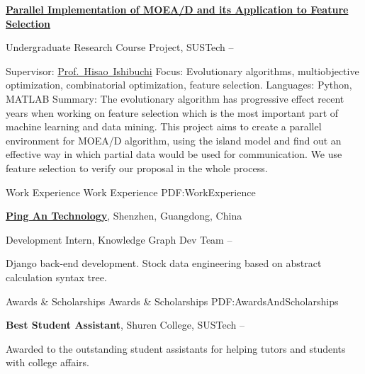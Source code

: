 \documentclass[a4paper,MMMyyyy,nonstopmode]{simpleresumecv}
\begin{document}
\begin{Body}
    \Entry
    \href{https://github.com/hackroid/pMOEA-D}
    {\textbf{Parallel Implementation of MOEA/D and its Application to Feature Selection}}

    \Gap
    \BulletItem
    Undergraduate Research Course Project, SUSTech
    \hfill
     --
    \begin{Detail}
        \SubBulletItem
        Supervisor:
        \href{http://cse.sustech.edu.cn/faculty/~hisao/}{Prof.~Hisao~Ishibuchi}
        \SubBulletItem
        Focus:
        Evolutionary algorithms, multiobjective optimization, combinatorial optimization, feature selection.
        \SubBulletItem
        Languages: Python, MATLAB
        \SubBulletItem
        Summary:
        The evolutionary algorithm has progressive effect recent years when working on feature selection which is the most important part of machine learning and data mining. This project aims to create a parallel environment for MOEA/D algorithm, using the island model and find out an effective way in which partial data would be used for communication. We use feature selection to verify our proposal in the whole process.
    \end{Detail}



    \Section
    {Work\newline
        Experience}
    {Work Experience}
    {PDF:WorkExperience}

    \Entry
    \href{https://tech.pingan.com/}
    {\textbf{Ping An Technology}},
    Shenzhen, Guangdong, China

    \Gap
    \BulletItem
    Development Intern,
    Knowledge Graph Dev Team
    \hfill
     --
    \begin{Detail}
        \SubBulletItem
        Django back-end development.
        \SubBulletItem
        Stock data engineering based on abstract calculation syntax tree.
    \end{Detail}



    \Section
    {Awards \&\newline
        Scholarships}
    {Awards \& Scholarships}
    {PDF:AwardsAndScholarships}

    \BulletItem
    \textbf{Best Student Assistant},
    Shuren College,
    SUSTech
    \hfill
     --
    \begin{Detail}
        \Item
        Awarded to the outstanding student assistants for helping tutors and students with college affairs.
    \end{Detail}


\end{Body}
\end{document}
